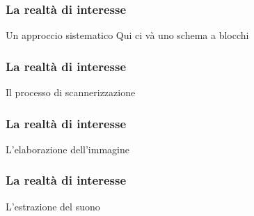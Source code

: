 \begin{frame}
\frametitle{La realtà di interesse}
\begin{block}{Un approccio sistematico}
Qui ci và uno schema a blocchi 
\end{block}
\end{frame}

\begin{frame}
\frametitle{La realtà di interesse}
\begin{block}{Il processo di scannerizzazione}

\end{block}
\end{frame}

\begin{frame}
\frametitle{La realtà di interesse}
\begin{block}{L'elaborazione dell'immagine}

\end{block}
\end{frame}

\begin{frame}
\frametitle{La realtà di interesse}
\begin{block}{L'estrazione del suono}

\end{block}
\end{frame}

